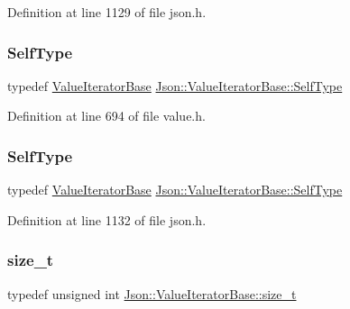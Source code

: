 Definition at line 1129 of file json.\+h.

\hypertarget{class_json_1_1_value_iterator_base_a9d2a940d03ea06d20d972f41a89149ee}{}\label{class_json_1_1_value_iterator_base_a9d2a940d03ea06d20d972f41a89149ee} 
\subsubsection{\texorpdfstring{Self\+Type}{SelfType}\hspace{0.1cm}{\footnotesize\ttfamily [1/2]}}
{\footnotesize\ttfamily typedef \hyperlink{class_json_1_1_value_iterator_base}{Value\+Iterator\+Base} \hyperlink{class_json_1_1_value_iterator_base_a9d2a940d03ea06d20d972f41a89149ee}{Json\+::\+Value\+Iterator\+Base\+::\+Self\+Type}}



Definition at line 694 of file value.\+h.

\hypertarget{class_json_1_1_value_iterator_base_a9d2a940d03ea06d20d972f41a89149ee}{}\label{class_json_1_1_value_iterator_base_a9d2a940d03ea06d20d972f41a89149ee} 
\subsubsection{\texorpdfstring{Self\+Type}{SelfType}\hspace{0.1cm}{\footnotesize\ttfamily [2/2]}}
{\footnotesize\ttfamily typedef \hyperlink{class_json_1_1_value_iterator_base}{Value\+Iterator\+Base} \hyperlink{class_json_1_1_value_iterator_base_a9d2a940d03ea06d20d972f41a89149ee}{Json\+::\+Value\+Iterator\+Base\+::\+Self\+Type}}



Definition at line 1132 of file json.\+h.

\hypertarget{class_json_1_1_value_iterator_base_a9d3a3c7ce5cdefe23cb486239cf07bb5}{}\label{class_json_1_1_value_iterator_base_a9d3a3c7ce5cdefe23cb486239cf07bb5} 
\subsubsection{\texorpdfstring{size\+\_\+t}{size\_t}\hspace{0.1cm}{\footnotesize\ttfamily [1/2]}}
{\footnotesize\ttfamily typedef unsigned int \hyperlink{class_json_1_1_value_iterator_base_a9d3a3c7ce5cdefe23cb486239cf07bb5}{Json\+::\+Value\+Iterator\+Base\+::size\+\_\+t}}



